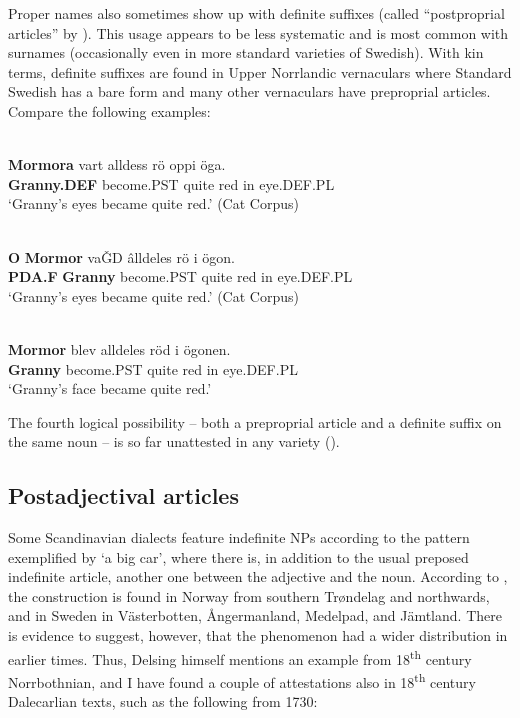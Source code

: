 Proper names also sometimes show up with definite suffixes (called “postproprial articles” by \citet[23]{Delsing2003a}). This usage appears to be less systematic and is most common with surnames (occasionally even in more standard varieties of Swedish). With kin terms, definite suffixes are found in Upper Norrlandic vernaculars where Standard Swedish has a bare form and many other vernaculars have preproprial articles. Compare the following examples:

\ea\label{}
\\
\gll \textbf{Mormora} vart  alldess  rö  oppi  öga.\\
\textbf{Granny.DEF} become.PST  quite  red  in  eye.DEF.PL\\
\glt ‘Granny’s eyes became quite red.’ (Cat Corpus)

\z

\ea\label{}
\\
\gll \textbf{O} \textbf{Mormor} vaǦD  âlldeles  rö  i  ögon.\\
\textbf{PDA.F} \textbf{Granny} become.PST  quite  red  in  eye.DEF.PL\\
\glt ‘Granny’s eyes became quite red.’ (Cat Corpus)

\z

\ea\label{}
\\
\gll \textbf{Mormor} blev  alldeles  röd  i  ögonen.\\
\textbf{Granny} become.PST  quite  red  in  eye.DEF.PL\\
\glt ‘Granny’s face became quite red.’ 

\z

The fourth logical possibility – both a preproprial article and a definite suffix on the same noun – is so far unattested in any variety (\citet{Törnqvist2002}). 

\subsection{ Postadjectival articles}

Some Scandinavian dialects feature indefinite NPs according to the pattern exemplified by ‘a big car’, where there is, in addition to the usual preposed indefinite article, another one between the adjective and the noun. According to \citet[46]{Delsing2003a}, the construction is found in Norway from southern Trøndelag and northwards, and in Sweden in Västerbotten, Ångermanland, Medelpad, and Jämtland. There is evidence to suggest, however, that the phenomenon had a wider distribution in earlier times. Thus, Delsing himself mentions an example from 18\textsuperscript{th} century Norrbothnian, and I have found a couple of attestations also in 18\textsuperscript{th} century Dalecarlian texts, such as the following from 1730: 

